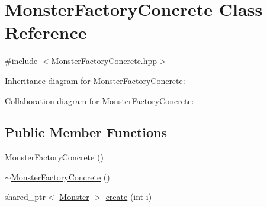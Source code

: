 \hypertarget{classMonsterFactoryConcrete}{\section{Monster\-Factory\-Concrete Class Reference}
\label{classMonsterFactoryConcrete}
}


{\ttfamily \#include $<$Monster\-Factory\-Concrete.\-hpp$>$}



Inheritance diagram for Monster\-Factory\-Concrete\-:


Collaboration diagram for Monster\-Factory\-Concrete\-:
\subsection*{Public Member Functions}
\begin{DoxyCompactItemize}
\item 
\hyperlink{classMonsterFactoryConcrete_a158199032137c19e2e1f5334babcc59f}{Monster\-Factory\-Concrete} ()
\item 
\hyperlink{classMonsterFactoryConcrete_af9cff2ecefff933107fbcfa13c2fd105}{$\sim$\-Monster\-Factory\-Concrete} ()
\item 
shared\-\_\-ptr$<$ \hyperlink{classMonster}{Monster} $>$ \hyperlink{classMonsterFactoryConcrete_a30595e25dd3b8513aef4326e4e0851b5}{create} (int i)
\end{DoxyCompactItemize}


